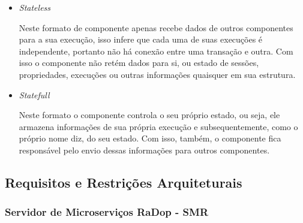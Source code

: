 \begin{itemize}


\item{\emph{Stateless}}\label{stateless}

Neste formato de componente apenas recebe dados de outros componentes
para a sua execução, isso infere que cada uma de suas execuções é
independente, portanto não há conexão entre uma transação e outra. Com
isso o componente não retém dados para si, ou estado de sessões,
propriedades, execuções ou outras informações quaisquer em sua
estrutura.

\item{\emph{Statefull}}\label{statefull}

Neste formato o componente controla o seu próprio estado, ou seja, ele
armazena informações de sua própria execução e subsequentemente, como o
próprio nome diz, do seu estado. Com isso, também, o componente fica
responsável pelo envio dessas informações para outros componentes.

\end{itemize}

\subsection{Requisitos e Restrições Arquiteturais}\label{requisitos-e-restricoes-arquiteturais}

\subsubsection{Servidor de Microserviços RaDop - SMR}\label{req-servidor-de-microservicos-radop---smr}

